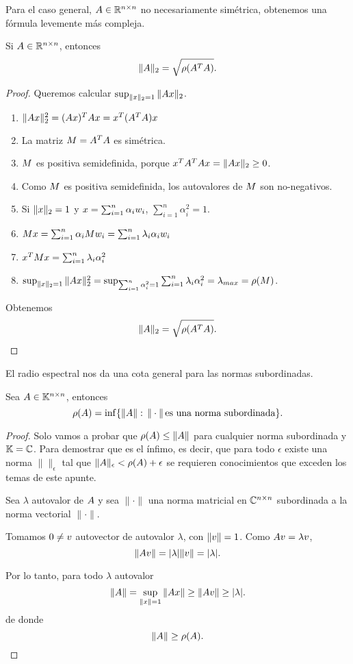 Para el caso general, $\Ab\in \R^{n\times n}$ no necesariamente simétrica, obtenemos una fórmula levemente más compleja.

\begin{prop}
Si  $\Ab\in \Rnn$, entonces
$$
\|\Ab\|_2=\sqrt{\rho(\Ab^T\Ab)}.$$
\end{prop}

\begin{proof}
Queremos calcular $\sup_{\|\xb\|_2=1}\|\Ab\xb\|_2$.

\begin{enumerate}
\item $\|\Ab\xb\|_2^2=(\Ab\xb)^T\Ab\xb=\xb^T(\Ab^T\Ab)\xb$
\item La matriz $\Mb=\Ab^T\Ab$ es simétrica.
\item $\Mb$ es positiva semidefinida, porque $\xb^T \Ab^T \Ab \xb = \|\Ab \xb\|_2 \ge 0$.
\item Como $\Mb$ es positiva semidefinida, los autovalores de $\Mb$ son no-negativos.
\item Si $\|\xb\|_2 = 1$ y $\xb=\sum_{i=1}^n\alpha_i\wb_i$, $\sum_{i=1}^n\alpha_i^2 = 1$.
\item $\Mb\xb=\sum_{i=1}^n\alpha_i\Mb\wb_i=\sum_{i=1}^n\lambda_i\alpha_i\wb_i$
\item $\xb^T\Mb\xb=\sum_{i=1}^n\lambda_i\alpha_i^2$
\item $\sup_{\|\xb\|_2=1}\|\Ab\xb\|_2^2=\sup_{\sum_{i=1}^n\alpha_i^2=1}\sum_{i=1}^n\lambda_i\alpha_i^2=\lambda_{max}=\rho(\Mb)$.
\end{enumerate}

Obtenemos
$$
\|\Ab\|_2=\sqrt{\rho(\Ab^T\Ab)}.
$$
\end{proof}

El radio espectral nos da una cota general para las normas subordinadas.

\begin{prop}
 \label{prop:infmat=rho}
Sea $\Ab\in\Knn$, entonces
$$
\rho(\Ab)=\inf
\{\|\Ab\|:\, \|\cdot \|\,  \mbox{es una norma subordinada}\}.$$
\end{prop}

\begin{proof}
Solo vamos a probar que  $\rho(\Ab)\le \|\Ab\|$ para cualquier norma subordinada y  $\mathbb K=\mathbb C$. Para demostrar que es el ínfimo, es decir, que para todo $\epsilon$ existe una norma $\| \|_{\epsilon}$ tal que $\|\Ab\|_{\epsilon} < \rho(\Ab) + \epsilon$ se requieren conocimientos que exceden los temas de este apunte.

 Sea $\lambda$ autovalor de $\Ab$ y sea $\|\cdot\|$ una norma matricial en $\mathbb C^{n\times n}$ subordinada a la norma vectorial  $\|\cdot\|$.

 Tomamos $\cero\neq\vb$ autovector de autovalor $\lambda$, con  $\|\vb\|=1$. Como $\Ab\vb=\lambda\vb$,
 $$ \|\Ab\vb\| = |\lambda|\|\vb\|=|\lambda|.$$

  Por lo tanto, para todo $\lambda$ autovalor
 $$
 \|\Ab\|=\sup_{\|\xb\|=1}\|\Ab\xb\|\ge \|\Ab\vb\|\ge |\lambda|.
 $$
 de donde
 $$
 \|\Ab\|\ge \rho(\Ab).
 $$

\end{proof}

